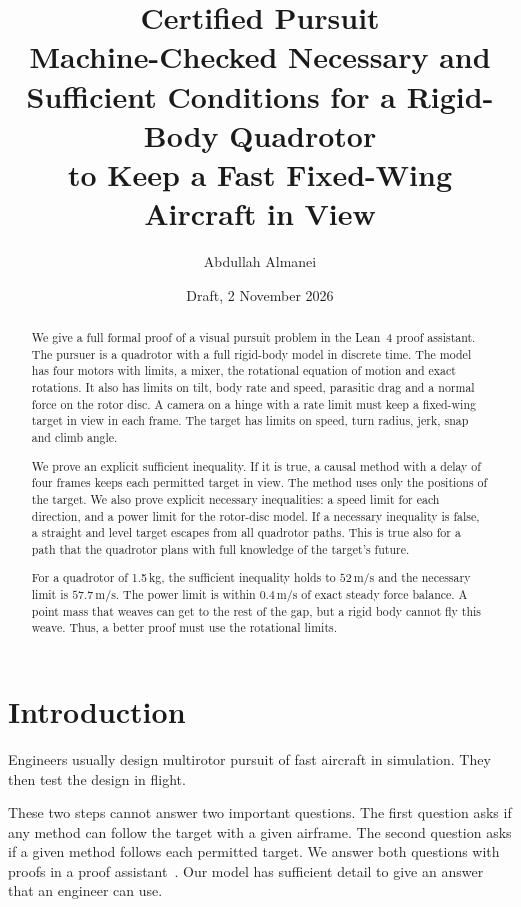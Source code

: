 \documentclass[11pt]{article}
\title{\textbf{Certified Pursuit}\\[4pt]
\large Machine-Checked Necessary and Sufficient Conditions for a Rigid-Body Quadrotor\\
to Keep a Fast Fixed-Wing Aircraft in View}
\author{Abdullah Almanei}
\date{Draft, 2 November 2026}
\theoremstyle{definition}
\newcommand{\ms}{\,\mathrm{m/s}}
\begin{document}
\maketitle

\begin{abstract}
We give a full formal proof of a visual pursuit problem in the Lean~4 proof assistant.
The pursuer is a quadrotor with a full rigid-body model in discrete time.
The model has four motors with limits, a mixer, the rotational equation of motion and exact
rotations.
It also has limits on tilt, body rate and speed, parasitic drag and a normal force on the rotor
disc.
A camera on a hinge with a rate limit must keep a fixed-wing target in view in each frame.
The target has limits on speed, turn radius, jerk, snap and climb angle.

We prove an explicit sufficient inequality.
If it is true, a causal method with a delay of four frames keeps each permitted target in view.
The method uses only the positions of the target.
We also prove explicit necessary inequalities: a speed limit for each direction, and a power limit
for the rotor-disc model.
If a necessary inequality is false, a straight and level target escapes from all quadrotor paths.
This is true also for a path that the quadrotor plans with full knowledge of the target's future.

For a quadrotor of 1.5\,kg, the sufficient inequality holds to $52\ms$ and the necessary limit is
$57.7\ms$.
The power limit is within $0.4\ms$ of exact steady force balance.
A point mass that weaves can get to the rest of the gap, but a rigid body cannot fly this weave.
Thus, a better proof must use the rotational limits.
\end{abstract}

\section{Introduction}

Engineers usually design multirotor pursuit of fast aircraft in simulation.
They then test the design in flight.

These two steps cannot answer two important questions.
The first question asks if any method can follow the target with a given airframe.
The second question asks if a given method follows each permitted target.
We answer both questions with proofs in a proof assistant~\cite{lean4,mathlib}.
Our model has sufficient detail to give an answer that an engineer can use.
\end{document}
